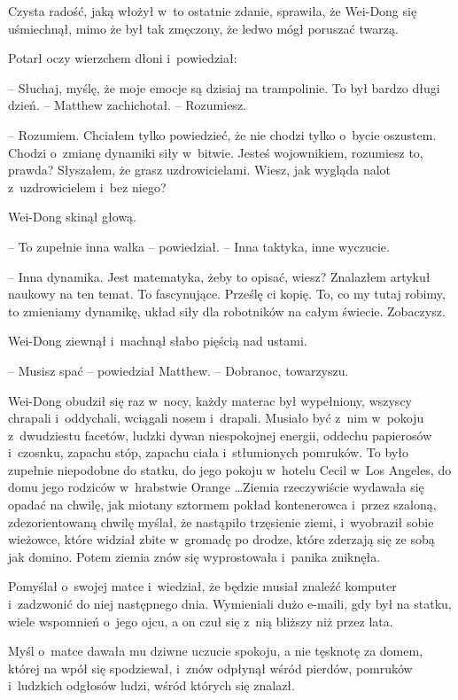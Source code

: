 \documentclass[oneside,polish,11pt,rmheadings]{mwbk}
\begin{document}
Czysta radość, jaką włożył w~to ostatnie zdanie, sprawiła, że Wei-Dong się uśmiechnął, mimo że był tak zmęczony, że ledwo mógł poruszać twarzą.

Potarł oczy wierzchem dłoni i~powiedział: 

-- Słuchaj, myślę, że moje emocje są dzisiaj na trampolinie. To był bardzo długi dzień. -- Matthew zachichotał. -- Rozumiesz. 

-- Rozumiem. Chciałem tylko powiedzieć, że nie chodzi tylko o~bycie oszustem. Chodzi o~zmianę dynamiki siły w~bitwie. Jesteś wojownikiem, rozumiesz to, prawda? Słyszałem, że grasz uzdrowicielami. Wiesz, jak wygląda nalot z~uzdrowicielem i~bez niego?

Wei-Dong skinął głową. 

-- To zupełnie inna walka -- powiedział. -- Inna taktyka, inne wyczucie.

-- Inna dynamika. Jest matematyka, żeby to opisać, wiesz? Znalazłem artykuł naukowy na ten temat. To fascynujące. Prześlę ci kopię. To, co my tutaj robimy, to zmieniamy dynamikę, układ siły dla robotników na całym świecie. Zobaczysz.

Wei-Dong ziewnął i~machnął słabo pięścią nad ustami.

-- Musisz spać -- powiedział Matthew. -- Dobranoc, towarzyszu. 

Wei-Dong obudził się raz w~nocy, każdy materac był wypełniony, wszyscy chrapali i~oddychali, wciągali nosem i~drapali. Musiało być z~nim w~pokoju z~dwudziestu facetów, ludzki dywan niespokojnej energii, oddechu papierosów i~czosnku, zapachu stóp, zapachu ciała i~stłumionych pomruków. To było zupełnie niepodobne do statku, do jego pokoju w~hotelu Cecil w~Los Angeles, do domu jego rodziców w~hrabstwie Orange \ldots  Ziemia rzeczywiście wydawała się opadać na chwilę, jak miotany sztormem pokład kontenerowca i~przez szaloną, zdezorientowaną chwilę myślał, że nastąpiło trzęsienie ziemi, i~wyobraził sobie wieżowce, które widział zbite w~gromadę po drodze, które zderzają się ze sobą jak domino. Potem ziemia znów się wyprostowała i~panika zniknęła.

Pomyślał o~swojej matce i~wiedział, że będzie musiał znaleźć komputer i~zadzwonić do niej następnego dnia. Wymieniali dużo e-maili, gdy był na statku, wiele wspomnień o~jego ojcu, a on czuł się z~nią bliższy niż przez lata.

Myśl o~matce dawała mu dziwne uczucie spokoju, a nie tęsknotę za domem, której na wpół się spodziewał, i~znów odpłynął wśród pierdów, pomruków i~ludzkich odgłosów ludzi, wśród których się znalazł.
\end{document}
